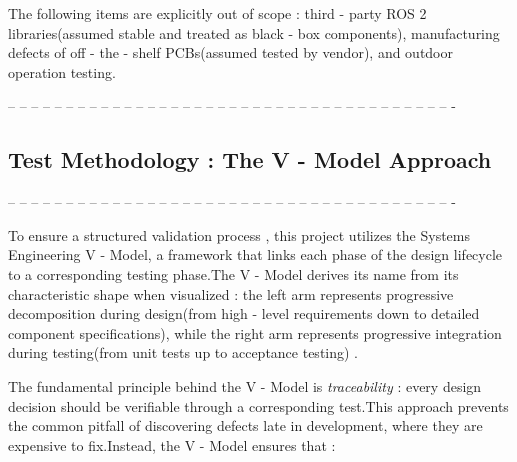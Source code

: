         The following items are explicitly out of scope : third -
        party ROS 2 libraries(assumed stable and treated as black -
                              box components),
    manufacturing defects of off - the - shelf PCBs(assumed tested by vendor),
    and outdoor operation testing.

        -- -- -- -- -- -- -- -- -- -- -- -- -- -- -- -- -- -- -- -- -- -- -- -- -- -- -- -- -- -- -- -- -- -- -- -- -- -- -
\subsection{Test Methodology : The V - Model Approach} %
        -- -- -- -- -- -- -- -- -- -- -- -- -- -- -- -- -- -- -- -- -- -- -- -- -- -- -- -- -- -- -- -- -- -- -- -- -- -- -

                                                                                                                          To
                                                                                                                          ensure
                                                                                                                          a
                                                                                                                          structured
                                                                                                                          validation
                                                                                                                          process
    ,
    this project utilizes the Systems Engineering V - Model,
    a framework that links each phase of the design lifecycle to a
        corresponding testing phase.The V
        - Model derives its name from its characteristic shape when visualized
    : the left arm represents progressive decomposition during
      design(from high -
             level requirements down to detailed component specifications),
    while the right arm represents progressive integration during
        testing(from unit tests up to acceptance testing)
            .

        The fundamental principle behind the V
        - Model is \textit{traceability}
    : every design decision should be verifiable through a
      corresponding test.This approach prevents the common pitfall of
      discovering defects late in development,
    where they are expensive to fix.Instead,
    the V - Model ensures that :

